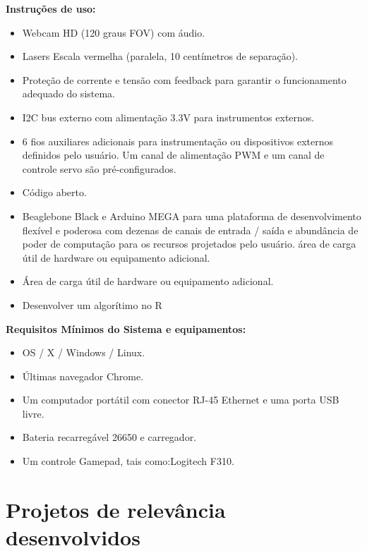 \textbf{\large Instruções de uso:}
 
\begin{itemize}

	\item Webcam HD (120 graus FOV) com áudio.
	\item Lasers Escala vermelha (paralela, 10 centímetros de separação).
	\item Proteção de corrente e tensão com feedback para garantir o funcionamento adequado do sistema.
	\item I2C bus externo com alimentação 3.3V para instrumentos externos.
	\item 6 fios auxiliares adicionais para instrumentação ou dispositivos externos definidos pelo usuário. Um canal de alimentação PWM e um canal de controle servo são pré-configurados.
	\item Código aberto.
	\item Beaglebone Black e Arduino MEGA para uma plataforma de desenvolvimento flexível e poderosa com dezenas de canais de entrada / saída e abundância de poder de computação para os recursos projetados pelo usuário.
	área de carga útil de hardware ou equipamento adicional.
	\item Área de carga útil de hardware ou equipamento adicional.
	\item Desenvolver um algorítimo no R
	
\end{itemize}

\textbf{\large Requisitos Mínimos do Sistema e equipamentos:}
 
\begin{itemize}

	\item OS / X / Windows / Linux.
	\item Últimas navegador Chrome.
	\item Um computador portátil com conector RJ-45 Ethernet e uma porta USB livre.
	\item Bateria recarregável 26650 e carregador.
	\item Um controle Gamepad, tais como:Logitech F310.
	
	
\end{itemize}




\section{Projetos de relevância desenvolvidos}

\cite{4}


